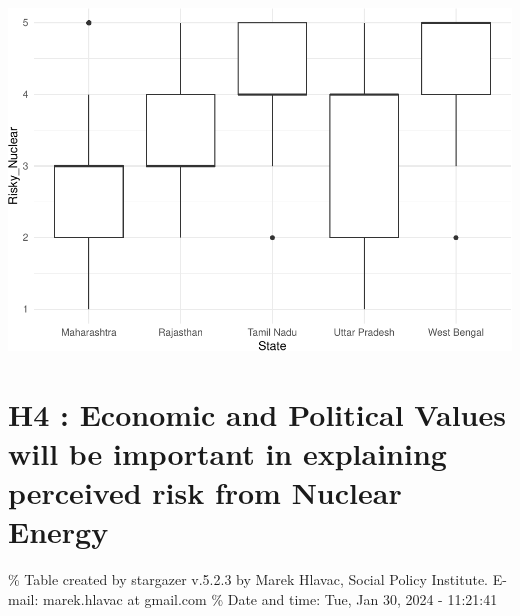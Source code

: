 \documentclass[
]{article}
\begin{document}
\includegraphics{Paper1_files/figure-latex/unnamed-chunk-30-5.pdf}

\newpage

\hypertarget{h4-economic-and-political-values-will-be-important-in-explaining-perceived-risk-from-nuclear-energy}{%
\section{H4 : Economic and Political Values will be important in
explaining perceived risk from Nuclear
Energy}\label{h4-economic-and-political-values-will-be-important-in-explaining-perceived-risk-from-nuclear-energy}}

\begingroup\setlength{\tabcolsep}{1pt}

\renewcommand{\arraystretch}{0.7}

\% Table created by stargazer v.5.2.3 by Marek Hlavac, Social Policy
Institute. E-mail: marek.hlavac at gmail.com \% Date and time: Tue, Jan
30, 2024 - 11:21:41
\end{document}
